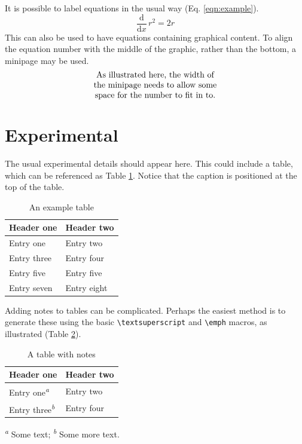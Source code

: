 \documentclass[journal=jacsat,manuscript=article]{achemso}
\begin{document}
It is possible to label equations in the usual way (Eq.
\ref{eqn:example}). \begin{equation}
  \frac{\mathrm{d}}{\mathrm{d}x} \, r^2 = 2r \label{eqn:example}
\end{equation} This can also be used to have equations containing
graphical content. To align the equation number with the middle of the
graphic, rather than the bottom, a minipage may be used.
\begin{equation}
  \begin{minipage}[c]{0.80\linewidth}
    \centering
    As illustrated here, the width of \\
    the minipage needs to allow some  \\
    space for the number to fit in to.
  \end{minipage}
  \label{eqn:graphic}
\end{equation}

\hypertarget{experimental}{%
\section{Experimental}\label{experimental}}

The usual experimental details should appear here. This could include a
table, which can be referenced as Table \ref{tbl:example}. Notice that
the caption is positioned at the top of the table.

\begin{table}
  \caption{An example table}
  \label{tbl:example}
  \begin{tabular}{ll}
    \hline
    Header one  & Header two  \\
    \hline
    Entry one   & Entry two   \\
    Entry three & Entry four  \\
    Entry five  & Entry five  \\
    Entry seven & Entry eight \\
    \hline
  \end{tabular}
\end{table}

Adding notes to tables can be complicated. Perhaps the easiest method is
to generate these using the basic
\texttt{\textbackslash textsuperscript} and \texttt{\textbackslash emph}
macros, as illustrated (Table \ref{tbl:notes}).

\begin{table}
  \caption{A table with notes}
  \label{tbl:notes}
  \begin{tabular}{ll}
    \hline
    Header one                            & Header two \\
    \hline
    Entry one\textsuperscript{\emph{a}}   & Entry two  \\
    Entry three\textsuperscript{\emph{b}} & Entry four \\
    \hline
  \end{tabular}

  \textsuperscript{\emph{a}} Some text;
  \textsuperscript{\emph{b}} Some more text.
\end{table}
\end{document}

